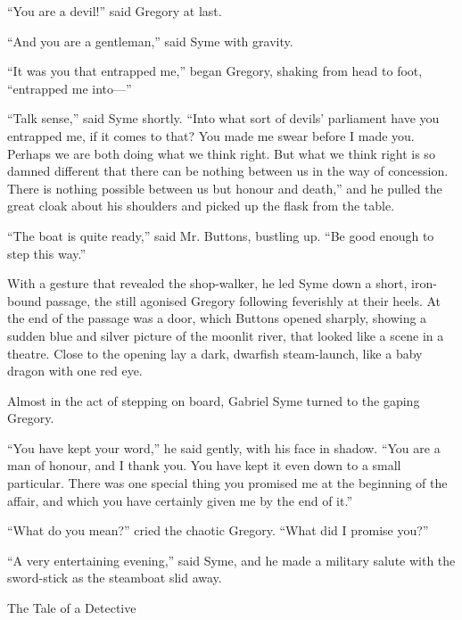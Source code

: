 “You are a devil!” said Gregory at last.

“And you are a gentleman,” said Syme with gravity.

“It was you that entrapped me,” began Gregory, shaking from head to foot, “entrapped me into⁠—”

“Talk sense,” said Syme shortly. “Into what sort of devils’ parliament have you entrapped me, if it comes to that? You made me swear before I made you. Perhaps we are both doing what we think right. But what we think right is so damned different that there can be nothing between us in the way of concession. There is nothing possible between us but honour and death,” and he pulled the great cloak about his shoulders and picked up the flask from the table.

“The boat is quite ready,” said Mr. Buttons, bustling up. “Be good enough to step this way.”

With a gesture that revealed the shop-walker, he led Syme down a short, iron-bound passage, the still agonised Gregory following feverishly at their heels. At the end of the passage was a door, which Buttons opened sharply, showing a sudden blue and silver picture of the moonlit river, that looked like a scene in a theatre. Close to the opening lay a dark, dwarfish steam-launch, like a baby dragon with one red eye.

Almost in the act of stepping on board, Gabriel Syme turned to the gaping Gregory.

“You have kept your word,” he said gently, with his face in shadow. “You are a man of honour, and I thank you. You have kept it even down to a small particular. There was one special thing you promised me at the beginning of the affair, and which you have certainly given me by the end of it.”

“What do you mean?” cried the chaotic Gregory. “What did I promise you?”

“A very entertaining evening,” said Syme, and he made a military salute with the sword-stick as the steamboat slid away.

\chap[taleof] The Tale of a Detective

